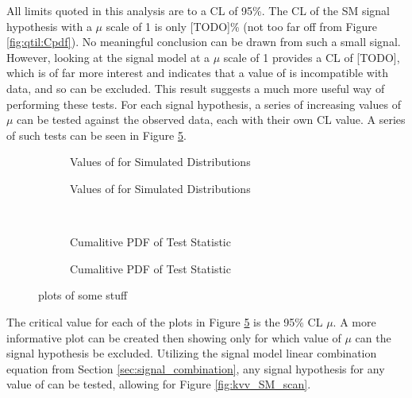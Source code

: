     All limits quoted in this analysis are to a CL of 95\%.
    The CL of the SM signal hypothesis with a $\mu$ scale of 1 is only [TODO]\%
        (not too far off from Figure \ref{fig:qtil:Cpdf}).
    No meaningful conclusion can be drawn from such a small signal.
    However, looking at the  signal model at a $\mu$ scale of 1 provides a CL of [TODO],
        which is of far more interest and indicates that a value of  is incompatible with data,
        and so can be excluded.
    This result suggests a much more useful way of performing these tests.
    For each signal hypothesis, a series of increasing values of $\mu$ can be tested against the observed data,
        each with their own CL value.
    A series of such tests can be seen in Figure \ref{fig:mu_CL_vals}.

    \begin{figure} %
        \centering
        \begin{subfigure}{0.4\textwidth} 
             
            \caption{Values of \qtil for Simulated Distributions}
            \label{fig:mu_CL_k2v0}
        \end{subfigure}
        \begin{subfigure}{0.4\textwidth} 
             
            \caption{Values of \qtil for Simulated Distributions}
            \label{fig:mu_CL_k2v1}
        \end{subfigure} \\
        \begin{subfigure}{0.4\textwidth}
             
            \caption{Cumalitive PDF of \qtil Test Statistic}
            \label{fig:mu_CL_k2v1.5}
        \end{subfigure}
        \begin{subfigure}{0.4\textwidth}
             
            \caption{Cumalitive PDF of \qtil Test Statistic}
            \label{fig:mu_CL_k2v3}
        \end{subfigure}
        \caption{
            plots of some stuff
        }\label{fig:mu_CL_vals}
    \end{figure}

    The critical value for each of the plots in Figure \ref{fig:mu_CL_vals} is the 95\% CL $\mu$.
    A more informative plot can be created then showing only
        for which value of $\mu$ can the signal hypothesis be excluded.
    Utilizing the signal model linear combination equation from Section \ref{sec:signal_combination},
        any signal hypothesis for any value of \kvv can be tested, allowing for Figure \ref{fig:kvv_SM_scan}.

